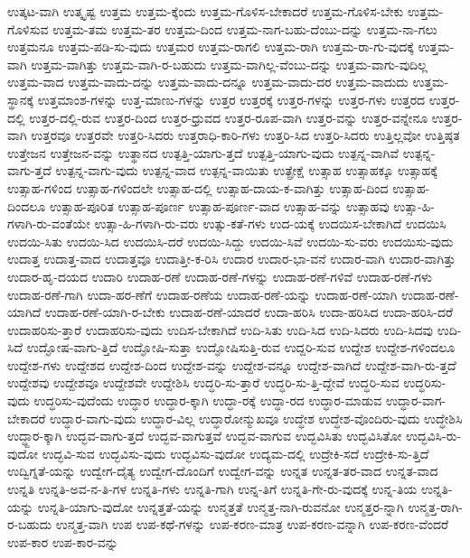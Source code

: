 {ಉತ್ಕಟ-ವಾಗಿ
ಉತ್ಕೃಷ್ಟ
ಉತ್ತಮ
ಉತ್ತಮ-ಕ್ಕೆಂದು
ಉತ್ತಮ-ಗೊಳಿಸ-ಬೇಕಾದರೆ
ಉತ್ತಮ-ಗೊಳಿಸ-ಬೇಕು
ಉತ್ತಮ-ಗೊಳಿಸುವ
ಉತ್ತಮ-ತಮ
ಉತ್ತಮ-ತರ
ಉತ್ತಮ-ದಿಂದ
ಉತ್ತಮ-ನಾಗ-ಬಹು-ದೆಂಬು-ದನ್ನು
ಉತ್ತಮ-ನಾ-ಗಲು
ಉತ್ತಮನೂ
ಉತ್ತಮ-ಪಡಿ-ಸು-ವುದು
ಉತ್ತಮರ
ಉತ್ತಮ-ರಾಗಲಿ
ಉತ್ತಮ-ರಾಗಿ
ಉತ್ತಮ-ರಾ-ಗು-ವುದಕ್ಕೆ
ಉತ್ತಮ-ವಾಗಿ
ಉತ್ತಮ-ವಾಗಿತ್ತು
ಉತ್ತಮ-ವಾಗಿ-ರ-ಬಹುದು
ಉತ್ತಮ-ವಾಗಿಲ್ಲ-ವೆಂಬು-ದನ್ನು
ಉತ್ತಮ-ವಾಗು-ವುದಿಲ್ಲ
ಉತ್ತಮ-ವಾದ
ಉತ್ತಮ-ವಾದು-ದನ್ನು
ಉತ್ತಮ-ವಾದು-ದನ್ನೂ
ಉತ್ತಮ-ವಾದು-ದರ
ಉತ್ತಮ-ವಾದುದು
ಉತ್ತಮ-ಸ್ಥಾನಕ್ಕೆ
ಉತ್ತಮಾಂಶ-ಗಳನ್ನು
ಉತ್ತ-ಮಾಣು-ಗಳನ್ನು
ಉತ್ತರ
ಉತ್ತರಕ್ಕೆ
ಉತ್ತರ-ಗಳನ್ನು
ಉತ್ತರ-ಗಳು
ಉತ್ತರದ
ಉತ್ತರ-ದಲ್ಲಿ
ಉತ್ತರ-ದಲ್ಲಿ-ರುವ
ಉತ್ತರ-ದಿಂದ
ಉತ್ತರ-ಧ್ರುವದ
ಉತ್ತರ-ರೂಪ-ವಾಗಿ
ಉತ್ತರ-ವನ್ನು
ಉತ್ತರ-ವನ್ನೇನೂ
ಉತ್ತರ-ವಾಗಿ
ಉತ್ತರವೂ
ಉತ್ತರವೇ
ಉತ್ತರಿ-ಸಿದರು
ಉತ್ತರಾಧಿ-ಕಾರಿ-ಗಳು
ಉತ್ತರಿ-ಸಿದ
ಉತ್ತರಿ-ಸಿದರು
ಉತ್ತಿಲ್ಲವೋ
ಉತ್ತಿಷ್ಠತ
ಉತ್ತೇಜನ
ಉತ್ತೇಜನ-ವನ್ನು
ಉತ್ಥಾನದ
ಉತ್ಪತ್ತಿ-ಯಾಗು-ತ್ತದೆ
ಉತ್ಪತ್ತಿ-ಯಾಗು-ವುದು
ಉತ್ಪನ್ನ-ವಾಗಿವೆ
ಉತ್ಪನ್ನ-ವಾಗು-ತ್ತದೆ
ಉತ್ಪನ್ನ-ವಾಗು-ವುದು
ಉತ್ಪನ್ನ-ವಾದ
ಉತ್ಪನ್ನ-ವಾಯಿತು
ಉತ್ಪ್ರೇಕ್ಷೆ
ಉತ್ಸಾಹ
ಉತ್ಸಾಹಕ್ಕೂ
ಉತ್ಸಾಹಕ್ಕೆ
ಉತ್ಸಾಹ-ಗಳಿಂದ
ಉತ್ಸಾಹ-ಗಳಿಂದಲೇ
ಉತ್ಸಾಹ-ದಲ್ಲಿ
ಉತ್ಸಾಹ-ದಾಯ-ಕ-ವಾಗಿತ್ತು
ಉತ್ಸಾಹ-ದಿಂದ
ಉತ್ಸಾಹ-ದಿಂದಲೂ
ಉತ್ಸಾಹ-ಪೂರಿತ
ಉತ್ಸಾಹ-ಪೂರ್ಣ
ಉತ್ಸಾಹ-ಪೂರ್ಣ-ವಾದ
ಉತ್ಸಾಹ-ವನ್ನು
ಉತ್ಸಾಹವು
ಉತ್ಸಾ-ಹಿ-ಗಳಾಗಿ-ರು-ವಂತೆಯೇ
ಉತ್ಸಾ-ಹಿ-ಗಳಾಗಿ-ರು-ವರು
ಉತ್ಸು-ಕತೆ-ಗಳು
ಉದ-ಯಕ್ಕೆ
ಉದಯಿಸ-ಬೇಕಾಗಿದೆ
ಉದಯಿಸಿ
ಉದಯಿ-ಸಿತು
ಉದಯಿ-ಸಿದ
ಉದಯಿಸಿ-ದರೆ
ಉದಯಿ-ಸಿದ್ದು
ಉದಯಿ-ಸಿವೆ
ಉದಯಿ-ಸು-ವರು
ಉದಯಿಸು-ವುದು
ಉದಾತ್ತ
ಉದಾತ್ತ-ವಾದ
ಉದಾತ್ತವೂ
ಉದಾತ್ತೀ-ಕ-ರಿಸಿ
ಉದಾರ
ಉದಾರ-ಭಾ-ವನೆ
ಉದಾರ-ವಾಗಿ
ಉದಾರ-ವಾಗಿತ್ತು
ಉದಾರ-ಹೃ-ದಯದ
ಉದಾರಿ
ಉದಾಹ-ರಣೆ
ಉದಾಹ-ರಣೆ-ಗಳನ್ನು
ಉದಾಹ-ರಣೆ-ಗಳಿವೆ
ಉದಾಹ-ರಣೆ-ಗಳು
ಉದಾಹ-ರಣೆ-ಗಾಗಿ
ಉದಾ-ಹರ-ಣೆಗೆ
ಉದಾಹ-ರಣೆಯ
ಉದಾಹ-ರಣೆ-ಯನ್ನು
ಉದಾಹ-ರಣೆ-ಯಾಗಿ
ಉದಾಹ-ರಣೆ-ಯಾಗಿದೆ
ಉದಾಹ-ರಣೆ-ಯಾಗಿ-ರ-ಬೇಕು
ಉದಾಹ-ರಣೆ-ಯಾದರೆ
ಉದಾ-ಹರಿಸಿ
ಉದಾ-ಹರಿಸಿದ
ಉದಾ-ಹರಿಸಿ-ದರೆ
ಉದಾಹರಿಸು-ತ್ತಾರೆ
ಉದಾಹರಿಸು-ವುದು
ಉದಿಸ-ಬೇಕಾಗಿದೆ
ಉದಿ-ಸಿತು
ಉದಿ-ಸಿದ
ಉದಿ-ಸಿದರು
ಉದಿ-ಸಿದವು
ಉದಿ-ಸಿದೆ
ಉದ್ಘೋಷ-ವಾಗು-ತ್ತಿದೆ
ಉದ್ಘೋಷಿ-ಸುತ್ತಾ
ಉದ್ಘೋಷಿಸುತ್ತಿ-ರುವ
ಉದ್ದರಿ-ಸುವ
ಉದ್ದೇಶ
ಉದ್ದೇಶ-ಗಳಿಂದಲೂ
ಉದ್ದೇಶ-ಗಳು
ಉದ್ದೇಶದ
ಉದ್ದೇಶ-ದಿಂದ
ಉದ್ದೇಶ-ವನ್ನು
ಉದ್ದೇಶ-ವನ್ನೂ
ಉದ್ದೇಶ-ವಾಗಿದೆ
ಉದ್ದೇಶ-ವಾಗಿ-ರು-ತ್ತದೆ
ಉದ್ದೇಶವು
ಉದ್ದೇಶವೂ
ಉದ್ದೇಶವೇ
ಉದ್ದೇಶಿಸಿ
ಉದ್ಧರಿ-ಸು-ತ್ತಾರೆ
ಉದ್ಧರಿ-ಸು-ತ್ತಿ-ದ್ದೇವೆ
ಉದ್ಧರಿ-ಸುವ
ಉದ್ಧರಿಸು-ವುದು
ಉದ್ಧರಿಸು-ವುದೆಂದು
ಉದ್ಧಾರ
ಉದ್ಧಾರ-ಕ್ಕಾಗಿ
ಉದ್ಧಾ-ರಕ್ಕೆ
ಉದ್ಧಾ-ರದ
ಉದ್ಧಾರ-ಮಾಡುವ
ಉದ್ಧಾರ-ವಾಗ-ಬೇಕಾದರೆ
ಉದ್ಧಾರ-ವಾಗು-ವುದು
ಉದ್ಧಾರ-ವಿಲ್ಲ
ಉದ್ಧಾರೋನ್ಮುಖವೂ
ಉದ್ಧೇಶ
ಉದ್ಧೇಶ-ವೊಂದಿರು-ವುದು
ಉದ್ಧೇಶಿಸಿ
ಉದ್ಧ್ದಾರ-ಕ್ಕಾಗಿ
ಉದ್ಭವ-ವಾಗು-ತ್ತದೆ
ಉದ್ಭವ-ವಾಗುತ್ತವೆ
ಉದ್ಭವ-ವಾಗುವ
ಉದ್ಭವಿಸಿತು
ಉದ್ಭವಿಸಿತೋ
ಉದ್ಭವಿಸಿ-ರು-ವುದೋ
ಉದ್ಭವಿ-ಸುವ
ಉದ್ಭವಿಸು-ವುದು
ಉದ್ಭವಿಸು-ವುದೋ
ಉದ್ಯಮ-ದಲ್ಲಿ
ಉದ್ರೇಕಿ-ಸದೆ
ಉದ್ರೇಕಿ-ಸು-ತ್ತಿದೆ
ಉದ್ವಿಗ್ನತೆ-ಯನ್ನು
ಉದ್ವೇಗ-ದೈತ್ಯ
ಉದ್ವೇಗ-ದೊಂದಿಗೆ
ಉದ್ವೇಗ-ವನ್ನು
ಉನ್ನತ
ಉನ್ನತ-ತರ-ವಾದ
ಉನ್ನತ-ವಾದ
ಉನ್ನತಿ
ಉನ್ನತಿ-ಅವ-ನ-ತಿ-ಗಳ
ಉನ್ನತಿ-ಗಳು
ಉನ್ನತಿ-ಗಾಗಿ
ಉನ್ನ-ತಿಗೆ
ಉನ್ನತಿ-ಗೇ-ರು-ವುದಕ್ಕೆ
ಉನ್ನ-ತಿಯ
ಉನ್ನತಿ-ಯನ್ನು
ಉನ್ನತಿ-ಯಾಗು-ವುದೋ
ಉನ್ನತ್ತತೆ-ಯನ್ನು
ಉನ್ಮತ್ತತೆ
ಉನ್ಮತ್ತ-ನಾಗಿ-ರುವನೋ
ಉನ್ಮತ್ತರ-ನ್ನಾಗಿ
ಉನ್ಮತ್ತ-ರಾಗಿ-ರ-ಬಹುದು
ಉನ್ಮತ್ತ-ವಾಗಿ
ಉಪ
ಉಪ-ಕಥೆ-ಗಳನ್ನು
ಉಪ-ಕರಣ-ಮಾತ್ರ
ಉಪ-ಕರಣ-ವನ್ನಾಗಿ
ಉಪ-ಕರಣ-ವೆಂದರೆ
ಉಪ-ಕಾರ
ಉಪ-ಕಾರ-ವನ್ನು
}
